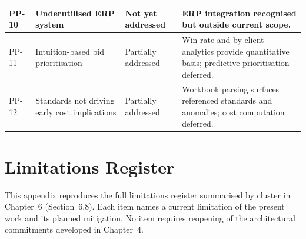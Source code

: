 \begin{xltabular}{\textwidth}{|p{1cm}|p{3.8cm}|p{2.2cm}|>{\RaggedRight\arraybackslash}X|}
PP-10 & Underutilised ERP system & Not yet addressed & ERP integration recognised but outside current scope. \\ \hline
PP-11 & Intuition-based bid prioritisation & Partially addressed & Win-rate and by-client analytics provide quantitative basis; predictive prioritisation deferred. \\ \hline
PP-12 & Standards not driving early cost implications & Partially addressed & Workbook parsing surfaces referenced standards and anomalies; cost computation deferred. \\ \hline
\end{xltabular}
\endgroup

\section{Limitations Register}
\label{app:limitations}

This appendix reproduces the full limitations register summarised by cluster in Chapter~6 (Section~6.8). Each item names a current limitation of the present work and its planned mitigation. No item requires reopening of the architectural commitments developed in Chapter~4.

